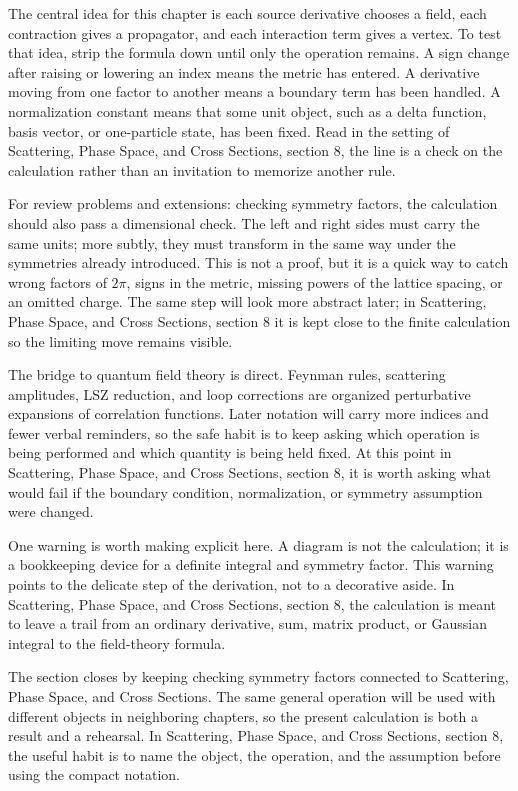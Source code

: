 The central idea for this chapter is each source derivative chooses a field, each contraction gives a propagator, and each interaction term gives a vertex.  To test that idea, strip the formula down until only the operation remains.  A sign change after raising or lowering an index means the metric has entered.  A derivative moving from one factor to another means a boundary term has been handled.  A normalization constant means that some unit object, such as a delta function, basis vector, or one-particle state, has been fixed.  Read in the setting of Scattering, Phase Space, and Cross Sections, section 8, the line is a check on the calculation rather than an invitation to memorize another rule.

For review problems and extensions: checking symmetry factors, the calculation should also pass a dimensional check.  The left and right sides must carry the same units; more subtly, they must transform in the same way under the symmetries already introduced.  This is not a proof, but it is a quick way to catch wrong factors of \(2\pi\), signs in the metric, missing powers of the lattice spacing, or an omitted charge.  The same step will look more abstract later; in Scattering, Phase Space, and Cross Sections, section 8 it is kept close to the finite calculation so the limiting move remains visible.

The bridge to quantum field theory is direct.  Feynman rules, scattering amplitudes, LSZ reduction, and loop corrections are organized perturbative expansions of correlation functions.  Later notation will carry more indices and fewer verbal reminders, so the safe habit is to keep asking which operation is being performed and which quantity is being held fixed.  At this point in Scattering, Phase Space, and Cross Sections, section 8, it is worth asking what would fail if the boundary condition, normalization, or symmetry assumption were changed.

One warning is worth making explicit here.  A diagram is not the calculation; it is a bookkeeping device for a definite integral and symmetry factor.  This warning points to the delicate step of the derivation, not to a decorative aside.  In Scattering, Phase Space, and Cross Sections, section 8, the calculation is meant to leave a trail from an ordinary derivative, sum, matrix product, or Gaussian integral to the field-theory formula.

The section closes by keeping checking symmetry factors connected to Scattering, Phase Space, and Cross Sections.  The same general operation will be used with different objects in neighboring chapters, so the present calculation is both a result and a rehearsal.  In Scattering, Phase Space, and Cross Sections, section 8, the useful habit is to name the object, the operation, and the assumption before using the compact notation.



